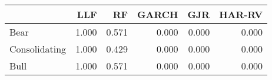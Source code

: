 \begin{tabular}{lrrrrr}
    \toprule
     & LLF & RF & GARCH & GJR & HAR-RV \\
    \midrule
    Bear & 1.000 & 0.571 & 0.000 & 0.000 & 0.000 \\
    Consolidating & 1.000 & 0.429 & 0.000 & 0.000 & 0.000 \\
    Bull & 1.000 & 0.571 & 0.000 & 0.000 & 0.000 \\
    \bottomrule
    \end{tabular}
    